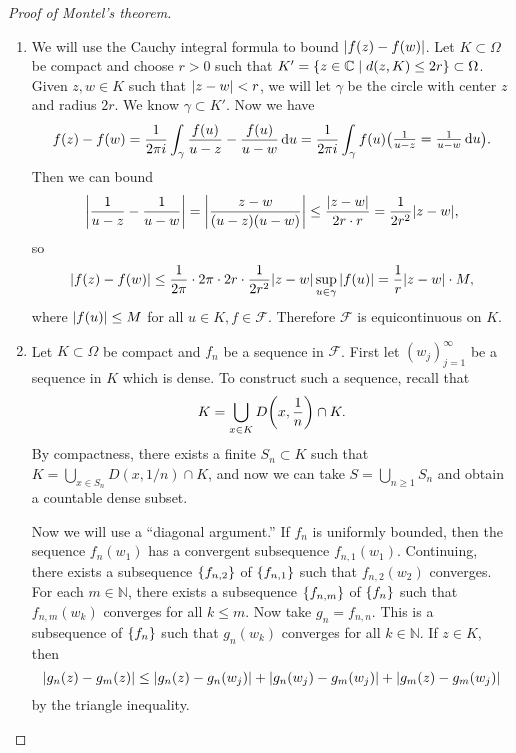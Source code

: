 \documentclass[leqno, openany]{memoir}
\theoremstyle{definition}
\theoremstyle{remark}
\theoremstyle{plain}
\theoremstyle{definition}
\theoremstyle{remark}
\newcommand{\C}{\mathbb{C}}
\newcommand{\N}{\mathbb{N}}
\newcommand{\mc}[1]{\mathcal{#1}}
\begin{document}
\begin{proof}[Proof of Montel's theorem]\leavevmode
    \begin{enumerate}
        \item We will use the Cauchy integral formula to bound $\abs{f(z) - f(w)}$. Let $K \subset \Omega$ be compact and choose $r > 0$ such that $K' = \qty{z \in \C \mid d(z,K) \leq 2r} \subset \Omega$. Given $z,w \in K$ such that $\abs{z - w} < r$, we will let $\gamma$ be the circle with center $z$ and radius $2r$. We know $\gamma \subset K'$. Now we have
            \begin{align*}
                f(z) - f(w) = \frac{1}{2 \pi i} \int_{\gamma} \frac{f(u)}{u-z} - \frac{f(u)}{u-w} \dd{u} = \frac{1}{2 \pi i} \int_{\gamma} f(u) \mqty(\frac{1}{u-z} = \frac{1}{u-w} \dd{u}).
            \end{align*}
            Then we can bound
            \[ \abs{\frac{1}{u-z} - \frac{1}{u-w}} = \abs{\frac{z-w}{(u-z)(u-w)}} \leq \frac{\abs{z-w}}{2r \cdot r} = \frac{1}{2r^2} \abs{z-w}, \]
            so 
            \[ \abs{f(z) - f(w)} \leq \frac{1}{2\pi} \cdot 2 \pi \cdot 2r \cdot \frac{1}{2r^2} \abs{z-w} \sup_{u \in \gamma} \abs{f(u)} = \frac{1}{r} \abs{z-w} \cdot M, \]
            where $\abs{f(u)} \leq M$ for all $u \in K, f \in \mc{F}$. Therefore $\mc{F}$ is equicontinuous on $K$.
        \item Let $K \subset \Omega$ be compact and $f_n$ be a sequence in $\mc{F}$. First let ${(w_j)}_{j=1}^{\infty}$ be a sequence in $K$ which is dense. To construct such a sequence, recall that 
            \[ K = \bigcup_{x \in K} D\qty(x, \frac{1}{n}) \cap K. \]
            By compactness, there exists a finite $S_n \subset K$ such that $K = \bigcup_{x \in S_n} D(x, 1/n) \cap K$, and now we can take $S = \bigcup_{n \geq 1} S_n$ and obtain a countable dense subset. 

            Now we will use a ``diagonal argument.'' If $f_n$ is uniformly bounded, then the sequence $f_n(w_1)$ has a convergent subsequence $f_{n,1}(w_1)$. Continuing, there exists a subsequence $\qty{f_{n,2}}$ of $\qty{f_{n,1}}$ such that $f_{n,2}(w_2)$ converges. For each $m \in \N$, there exists a subsequence $\qty{f_{n,m}}$ of $\qty{f_n}$ such that $f_{n,m}(w_k)$ converges for all $k \leq m$. Now take $g_n = f_{n,n}$. This is a subsequence of $\qty{f_n}$ such that $g_n(w_k)$ converges for all $k \in \N$. If $z \in K$, then 
            \[ \abs{g_n(z) - g_m(z)} \leq \abs{g_n(z) - g_n(w_j)} + \abs{g_n(w_j) - g_m(w_j)} + \abs{g_m(z) - g_m(w_j)} \]
            by the triangle inequality. 


\end{enumerate}
\end{proof}
\end{document}
